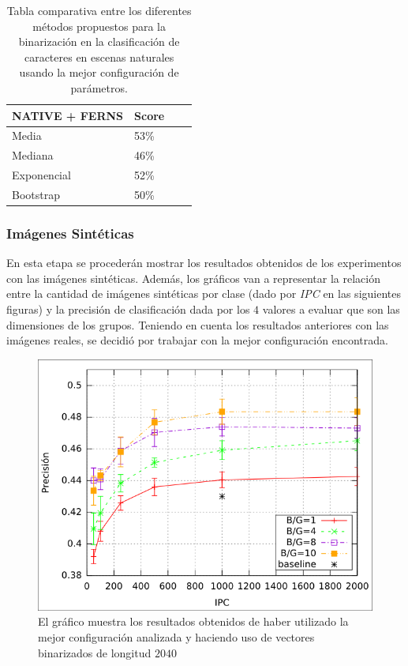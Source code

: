	\begin{table}
		\centering
		\begin{tabular}{ | l | l | l | p{5cm} |}
    			\hline
    				\textbf{NATIVE + FERNS} & \textbf{Score} \\ \hline
    				Media & 53\% \\ \hline
    				Mediana & 46\%\\ \hline
    				Exponencial & 52\% \\ \hline
    				Bootstrap & 50\%\\
    			\hline
    		\end{tabular}
    		\caption[Resultados imágenes naturales]{Tabla comparativa entre los diferentes métodos propuestos para la binarización en la clasificación de caracteres en escenas naturales usando la mejor configuración de parámetros.}
    		\label{table: reales-comparativa}
    	\end{table}


    	\newpage
    	\subsubsection{Imágenes Sintéticas}

    En esta etapa se procederán mostrar los resultados obtenidos de los experimentos con las imágenes sintéticas. Además, los gráficos van a representar la relación entre la cantidad de imágenes sintéticas por clase (dado por \textit{IPC} en las siguientes figuras) y la precisión de clasificación dada por los $4$ valores a evaluar que son las dimensiones de los grupos. Teniendo en cuenta los resultados anteriores con las imágenes reales, se decidió por trabajar con la mejor configuración encontrada.

			\begin{figure}[htbp]
				\centering
				\centerline{
					\includegraphics[scale=0.6]{img/resultados/sinteticas/mean_2040.png}
				}
				\caption[Sintéticas media 2040]{El gráfico muestra los resultados obtenidos de haber utilizado la mejor configuración analizada y haciendo uso de vectores binarizados de longitud $2040$}
				\label{fig: Sinteticas-media-2040}
			\end{figure}

